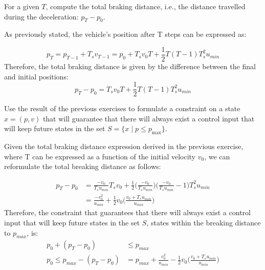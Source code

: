 \documentclass[]{article}
\begin{document}
\begin{assignment}
	For a given $T$, compute the total braking distance, i.e., the distance travelled during the 
	deceleration: $p_T - p_0$. 
\end{assignment}

\begin{flushleft}
As previously stated, the vehicle's position after T steps can be expressed as:
\end{flushleft}
\begin{equation}
		p_T = p_{T-1} + T_s v_{T-1} = p_0 + T_s v_0 T + \frac{1}{2} T (T-1) T_s^2 u_{min}
\end{equation}
Therefore, the total braking distance is given by the difference between the final and initial positions:
\begin{equation}
		p_T - p_0 = T_s v_0 T + \frac{1}{2} T (T-1) T_s^2 u_{min}
\end{equation}




\begin{assignment}\label{ex:sess2-constraint}
   Use the result of the previous exercises to formulate a constraint on a state $x = (p, v)$ that 
   will guarantee that there will always exist a control input that will keep future states 
   in the set $S = \{x \mid p \leq p_{\max}\}$.
\end{assignment}

\begin{flushleft}
	Given the total braking distance expression derived in the previous exercise, where T can be expressed as a function of the initial velocity $v_0$, we can reformulate the total breaking distance as follows:
\end{flushleft}
\begin{equation}
	\begin{aligned}
		p_T - p_0 &= \frac{-v_0}{T_s u_{min}} T_s v_0 + \frac{1}{2} \Bigg(\frac{-v_0}{T_s u_{min}}\Bigg) \Bigg(\frac{-v_0}{T_s u_{min}}-1\Bigg) T_s^2 u_{min} \\
				  &= \frac{-v_0^2}{u_{min}} + \frac{1}{2} v_0 \Bigg( \frac{v_0 + T_s u_{min}}{u_{min}}\Bigg) 
	\end{aligned}
\end{equation}
Therefore, the constraint that guarantees that there will always exist a control input that will keep future states in the set $S$, states within the breaking distance to $p_{max}$, is:
\begin{equation}
	\begin{aligned}
		p_0 + (p_T - p_0) &\leq p_{max} \\
		p_0 \leq p_{max} - (p_T - p_0) &= p_{max} + \frac{v_0^2}{u_{min}} - \frac{1}{2} v_0 \Bigg( \frac{v_0 + T_s u_{min}}{u_{min}}\Bigg)
	\end{aligned}
\end{equation}
\end{document}
